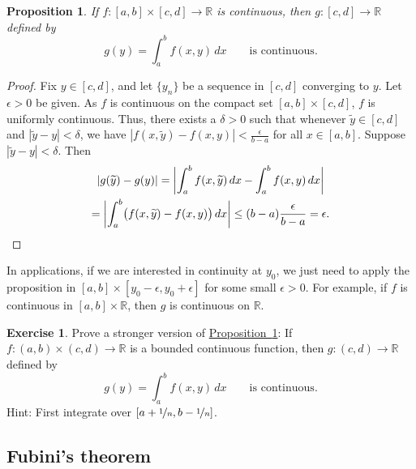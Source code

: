 \documentclass[12pt,openany]{book}
\newcommand{\bbabs}[1]{\biggl\lvert {#1} \biggr\rvert}
\newcommand{\abs}[1]{\left\lvert {#1} \right\rvert}
\newcommand{\R}{{\mathbb{R}}}
\theoremstyle{plain}
\newtheorem{prop}[thm]{Proposition}
\theoremstyle{remark}
\theoremstyle{definition}
\newenvironment{exbox}{%
    \def\FrameCommand{\vrule width 1pt \relax\hspace{10pt}}%
    \MakeFramed{\advance\hsize-\width\FrameRestore}%
}{%
    \endMakeFramed
}
\theoremstyle{exercise}
\newtheorem{exercise}{Exercise}[section]
\theoremstyle{example}
\newcommand{\propref}[1]{\hyperref[#1]{Proposition~\ref*{#1}}}
\begin{document}
\begin{prop} \label{prop:integralcontcont}
If $f \colon [a,b] \times [c,d] \to \R$ is continuous,
then $g \colon [c,d] \to \R$ defined by
\begin{equation*}
g(y) = \int_a^b f(x,y) \,dx  \qquad \text{is continuous}.
\end{equation*}
\end{prop}

\begin{proof}
Fix $y \in [c,d]$, and let $\{ y_n \}$ be a sequence in $[c,d]$
converging to $y$.
Let $\epsilon > 0$ be given.
As $f$ is continuous on the compact set $[a,b] \times [c,d]$, $f$
is uniformly continuous.  
Thus, there exists a $\delta > 0$ such that
whenever $\widetilde{y} \in [c,d]$ and
$\abs{\widetilde{y}-y} < \delta$, we have
$\abs{f(x,\widetilde{y})-f(x,y)} < \frac{\epsilon}{b-a}$ for all $x \in [a,b]$.
Suppose $\abs{\widetilde{y}-y} < \delta$.  Then
\begin{multline*}
\abs{
g(\widetilde{y})-
g(y)
}
=
\bbabs{
\int_a^b 
f(x,\widetilde{y}) \,dx 
-
\int_a^b 
f(x,y) \,dx 
}
\\
=
\bbabs{
\int_a^b 
\bigl(
f(x,\widetilde{y}) - f(x,y)
\bigr)
\,dx 
}
\leq
(b-a)
\frac{\epsilon}{b-a}
= \epsilon . \qedhere
\end{multline*}
\end{proof}

In applications, if we are interested in continuity at $y_0$, we just
need to apply the proposition in $[a,b] \times [y_0-\epsilon,y_0+\epsilon]$
for some small $\epsilon > 0$.  For example, if $f$ is continuous in
$[a,b] \times \R$, then $g$ is continuous on $\R$.

\begin{exbox}
\begin{exercise} \label{exercise:integralcontcontextra}
Prove a stronger version of \propref{prop:integralcontcont}:
If $f \colon (a,b) \times (c,d) \to \R$ is a bounded continuous function,
then $g \colon (c,d) \to \R$ defined by
\begin{equation*}
g(y) = \int_a^b f(x,y) \,dx  \qquad \text{is continuous}.
\end{equation*}
Hint: First integrate over $[a+\nicefrac{1}{n},b-\nicefrac{1}{n}]$.
\end{exercise}
\end{exbox}

\subsection{Fubini's theorem}
\end{document}
